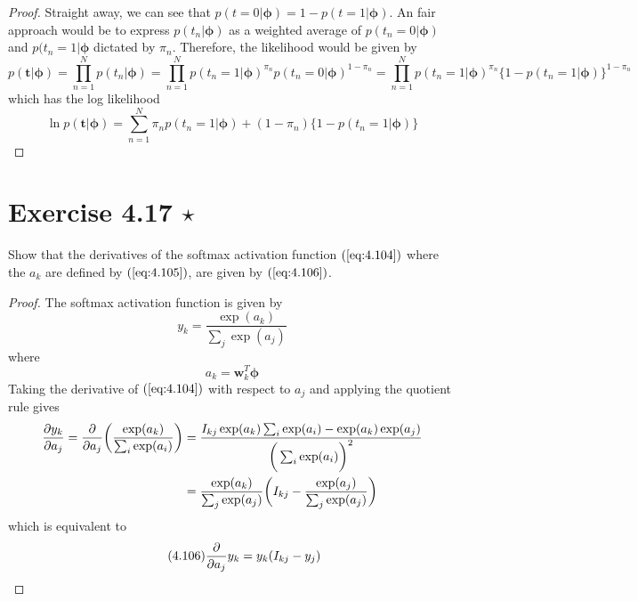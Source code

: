 \vspace{1em}

\begin{proof}
    Straight away, we can see that $p(t = 0 | \bm{\phi}) = 1 - p(t = 1 | \bm{\phi})$.
    An fair approach would be to express $p(t_n | \bm{\phi})$ as a weighted
    average of $p(t_n = 0 | \bm{\phi})$ and $p(t_n = 1 | \bm{\phi}$ dictated by $\pi_n$.
    Therefore, the likelihood would be given by 
    \[
        p(\mathbf{t} | \bm{\phi})
        = \prod_{n = 1}^N p(t_n | \bm{\phi})
        = \prod_{n = 1}^N p(t_n = 1 | \bm{\phi})^{\pi_n}
        p(t_n = 0 | \bm{\phi})^{1 - \pi_n}
        = \prod_{n = 1}^N p(t_n = 1 | \bm{\phi})^{\pi_n}
        \big\{1 - p(t_n = 1 | \bm{\phi})\big\}^{1 - \pi_n}
    \] 
    which has the log likelihood
    \[
        \ln p(\mathbf{t} | \bm{\phi}) 
        = \sum_{n=1}^{N} \pi_n p(t_n = 1 | \bm{\phi})
        + (1 - \pi_n)\big\{1 - p(t_n = 1 | \bm{\phi})\big\}
    \] 
\end{proof}

\section*{Exercise 4.17 $\star$}
Show that the derivatives of the softmax activation function
$(\ref{eq:4.104})$ where the $a_k$ are defined by $(\ref{eq:4.105})$, are
given by $(\ref{eq:4.106})$.

\vspace{1em}

\begin{proof}
    The softmax activation function is given by
    \begin{equation}\label{eq:4.104}\tag{4.104}
        y_k = \frac{\exp(a_k)}{\sum_{j} \exp(a_j)}
    \end{equation}
    where
    \begin{equation}\label{eq:4.105}\tag{4.105}
        a_k = \mathbf{w}_k^T\bm{\phi}
    \end{equation}
    Taking the derivative of $(\ref{eq:4.104})$ with respect to
    $a_j$ and applying the quotient rule gives
    \begin{align*}
        \pdv{y_k}{a_j} 
        = \pdv{a_j} \bigg(\frac{\exp(a_k)}{\sum_{i} \exp(a_i)}\bigg)
        &= \frac{I_{kj} \exp(a_k) \sum_{i} \exp(a_i) - \exp(a_k)\exp(a_j)} 
        {\bigg(\sum_{i} \exp(a_i)\bigg)^2} \\
        &= \frac{\exp(a_k)}{\sum_{j} \exp(a_j)}
        \bigg(I_{kj} - \frac{\exp(a_j)}{\sum_{j} \exp(a_j)}\bigg)
    \end{align*}
    which is equivalent to 
    \begin{equation}\label{eq:4.106}\tag{4.106}
        \pdv{a_j} y_k = y_k(I_{kj} - y_j)
    \end{equation}
\end{proof}

